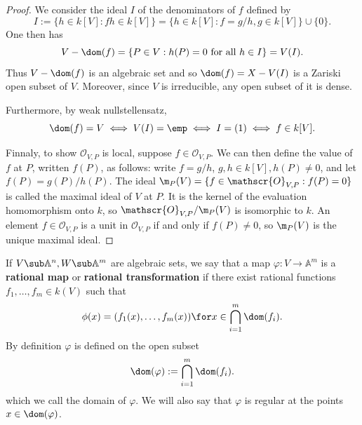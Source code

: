 \begin{proof}
We consider the ideal $I$ of the denominators of $f$ defined by
\[I:=\{h\in k[V]:fh\in k[V]\}=\{h\in k[V]:f=g/h,g\in k[V]\}\cup\{0\}.\]
One then has
\[V-\dom(f)=\{P\in V:h(P)=0\text{ for all }h\in I\}=V(I).\]
Thus $V-\dom(f)$ is an algebraic set and so $\dom(f)=X-V(I)$ is a Zariski
open subset of $V$. Moreover, since $V$ is irreducible, any open subset of it is dense.\par
Furthermore, by weak nullstellensatz,
\[\dom(f)=V\iff V(I)=\emp\iff I=(1)\iff f\in k[V].\]

Finnaly, to show $\mathscr{O}_{V,P}$ is local, suppose $f\in\mathscr{O}_{V,P}$. We can then define the value of $f$ at $P$, written $f(P)$, as follows: write $f=g/h$, $g,h\in k[V],h(P)\neq 0$, and let $f(P)=g(P)/h(P)$. The ideal $\m_P(V)=\{f\in\mathscr{O}_{V,P}:f(P)=0\}$ is called the maximal ideal of $V$ at $P$. It is the kernel of the evaluation homomorphism onto $k$, so $\mathscr{O}_{V,P}/\m_P(V)$ is isomorphic to $k$. An element $f\in\mathscr{O}_{V,P}$ is a unit in $\mathscr{O}_{V,P}$ if and only if $f(P)\neq 0$, so $\m_P(V)$ is the unique maximal ideal.
\end{proof}
If $V\sub\mathbb{A}^n,W\sub\mathbb{A}^m$ are algebraic sets, we say that a map $\varphi:V\to\mathbb{A}^m$ is a \textbf{rational map} or \textbf{rational transformation} if there exist rational functions $f_1,\dots,f_m\in k(V)$ such that
\[\phi(x)=(f_1(x),\dots,f_m(x))\for x\in\bigcap_{i=1}^{m}\dom(f_i).\]
By definition $\varphi$ is defined on the open subset
\[\dom(\varphi):=\bigcap_{i=1}^{m}\dom(f_i).\]
which we call the domain of $\varphi$. We will also say that $\varphi$ is regular at the points $x\in\dom(\varphi)$.
